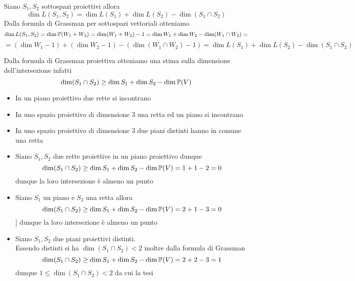 \begin{prop}\bianco 
Siano $S_1,S_2$ sottospazi proiettivi allora
$$ \dim L(S_1,S_2) = \dim L(S_1) + \dim L(S_2) -\dim (S_1\cap S_2)$$
\proof Dalla formula di Grassman per sottospazi vettoriali otteniamo
$$ \dim L(S_1,S_2) = \dim \mathbb{P}(W_1+W_2) =\dim (W_1+W_2) -1 =\dim W_1 +\dim W_2 -\dim (W_1\cap W_2) =$$
$$=(\dim W_1 -1) +(\dim W_2 -1) -(\dim (W_1 \cap W_2)-1)=\dim L(S_1) + \dim L(S_2) -\dim (S_1\cap S_2)$$
\end{prop}
\begin{oss}Dalla formula di Grassman proiettiva otteniamo una stima sulla dimensione dell'intersezione infatti
$$ \dim (S_1\cap S_2) \geq \dim S_1 + \dim S_2 - \dim \mathbb{P}(V)$$
\end{oss}
\begin{prop}\bbianco
\begin{itemize}
\item In un piano proiettivo due rette si incontrano 
\item In uno spazio proiettivo di dimensione 3 una retta ed un piano si incontrano 
\item In uno spazio proiettivo di dimensione 3 due piani distinti hanno in comune una retta
\end{itemize}
\proof \bbianco
\begin{itemize}
\item Siano $S_1,S_2$ due rette proiettive in un piano proiettivo dunque 
$$\dim (S_1\cap S_2) \geq \dim S_1 + \dim S_2  -\dim \mathbb{P}(V) = 1+1-2=0$$
dunque la loro intersezione \`e almeno un punto 
\item Siano $S_1$ un piano e $S_2$ una retta allora
$$ \dim (S_1\cap S_2) \geq \dim S_1 + \dim S_2 -\dim \mathbb{P}(V) = 2+1-3 = 0$$]
dunque la loro intersezione \`e almeno un punto
\item Siano $S_1, S_2$ due piani proiettivi distinti.\\
Essendo distinti si ha $\dim (S_1\cap S_2)<2$ inoltre dalla formula di Grassman
$$ \dim (S_	1\cap S_2)\geq \dim S_1 +\dim S_2 -\dim \mathbb{P}(V) = 2 +2 -3 = 1$$
dunque $1\leq \dim(S_1\cap S_2) <2$ da cui la tesi

\end{itemize}
\end{prop}
